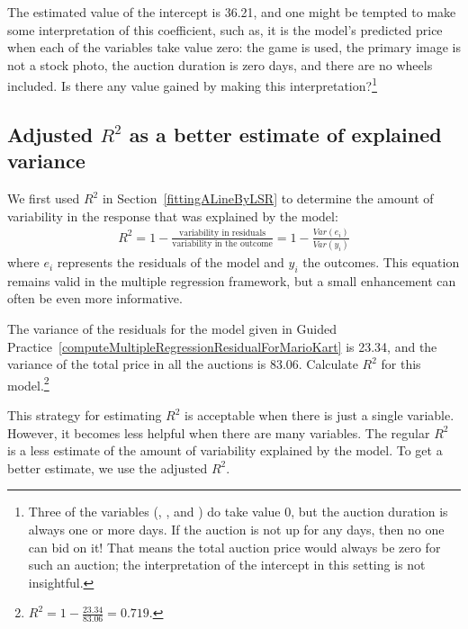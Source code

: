 \begin{exercise}
The estimated value of the intercept is 36.21, and one might be tempted to make some interpretation of this coefficient, such as, it is the model's predicted price when each of the variables take value zero: the game is used, the primary image is not a stock photo, the auction duration is zero days, and there are no wheels included. Is there any value gained by making this interpretation?\footnote{Three of the variables (, , and ) do take value 0, but the auction duration is always one or more days. If the auction is not up for any days, then no one can bid on it! That means the total auction price would always be zero for such an auction; the interpretation of the intercept in this setting is not insightful.}
\end{exercise}


\subsection{Adjusted $R^2$ as a better estimate of explained variance}


We first used $R^2$ in Section~\ref{fittingALineByLSR} to determine the amount of variability in the response that was explained by the model:
\begin{align*}
R^2 = 1 - \frac{\text{variability in residuals}}{\text{variability in the outcome}}
	= 1 - \frac{Var(e_i)}{Var(y_i)}
\end{align*}
where $e_i$ represents the residuals of the model and $y_i$ the outcomes. This equation remains valid in the multiple regression framework, but a small enhancement can often be even more informative.

\begin{exercise} \label{computeUnadjustedR2ForAllPredictorsInMarioKart}
The variance of the residuals for the model given in Guided Practice~\ref{computeMultipleRegressionResidualForMarioKart} is 23.34, and the variance of the total price in all the auctions is 83.06. Calculate $R^2$ for this model.\footnote{$R^2 = 1 - \frac{23.34}{83.06} = 0.719$.}
\end{exercise}

This strategy for estimating $R^2$ is acceptable when there is just a single variable. However, it becomes less helpful when there are many variables. The regular $R^2$ is a less estimate of the amount of variability explained by the model. To get a better estimate, we use the adjusted $R^2$.

